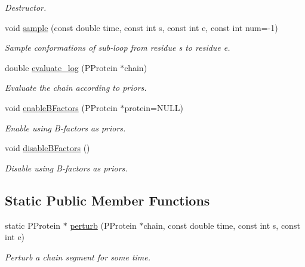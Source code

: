 \begin{DoxyCompactItemize}
\begin{DoxyCompactList}\small\item\em Destructor. \end{DoxyCompactList}\item 
void \hyperlink{classLoopTKSampler_aef29ac3db2e56f3f23b87fb5208649ad}{sample} (const double time, const int s, const int e, const int num=-\/1)
\begin{DoxyCompactList}\small\item\em Sample conformations of sub-\/loop from residue s to residue e. \end{DoxyCompactList}\item 
double \hyperlink{classLoopTKSampler_a9e241902e1ec0a6de40eb6a7029a83aa}{evaluate\-\_\-log} (P\-Protein $\ast$chain)
\begin{DoxyCompactList}\small\item\em Evaluate the chain according to priors. \end{DoxyCompactList}\item 
void \hyperlink{classLoopTKSampler_a27eb6b16d81e877bcab8fef0cd3787b9}{enable\-B\-Factors} (P\-Protein $\ast$protein=N\-U\-L\-L)
\begin{DoxyCompactList}\small\item\em Enable using B-\/factors as priors. \end{DoxyCompactList}\item 
\hypertarget{classLoopTKSampler_ad5bf1c6c82542ee1f0768d01d77ccc57}{void \hyperlink{classLoopTKSampler_ad5bf1c6c82542ee1f0768d01d77ccc57}{disable\-B\-Factors} ()}\label{classLoopTKSampler_ad5bf1c6c82542ee1f0768d01d77ccc57}

\begin{DoxyCompactList}\small\item\em Disable using B-\/factors as priors. \end{DoxyCompactList}\end{DoxyCompactItemize}
\subsection*{Static Public Member Functions}
\begin{DoxyCompactItemize}
\item 
static P\-Protein $\ast$ \hyperlink{classLoopTKSampler_aa02574c42ca3ac405af4b392f02d63cc}{perturb} (P\-Protein $\ast$chain, const double time, const int s, const int e)
\begin{DoxyCompactList}\small\item\em Perturb a chain segment for some time. \end{DoxyCompactList}\end{DoxyCompactItemize}
